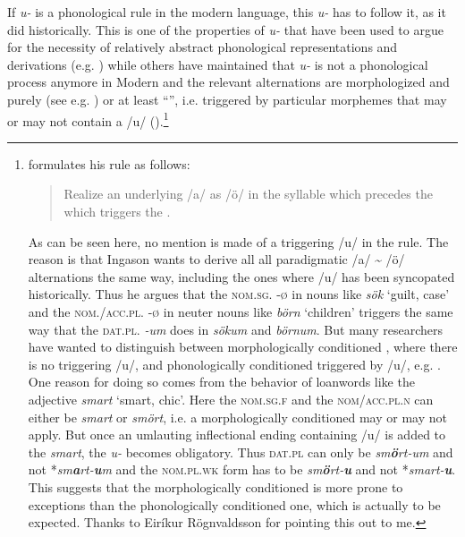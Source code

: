 \documentclass[output=paper,
modfonts
]{LSP/langsci}
\begin{document}
\noindent If \emph{u-} is a phonological rule in the modern language, this
\emph{u-} has to follow it, as it did historically. This is
one of the properties of \emph{u-} that have been used to argue
for the necessity of relatively abstract phonological representations
and derivations (e.g. \citealt{anderson1969a,anderson1974,roegnvaldsson1981,thrainsson2011,hansson2013}) while others have maintained that
\emph{u-} is not a phonological process anymore in Modern
 and the relevant alternations are morphologized and purely
 (see e.g. \citealt{markusson2012}) or at least ``'',
i.e. triggered by particular morphemes that may or may not contain a /u/
(\citealt{ingason2016}).\footnote{\citet[220]{ingason2016} formulates his  rule as follows:

  \begin{quote}
  Realize an underlying /a/ as /ö/ in the syllable which precedes the
   which triggers the .
  \end{quote}

  \noindent As can be seen here, no mention is made of a triggering /u/ in the
  rule. The reason is that Ingason wants to derive all all paradigmatic
  /a/ \textasciitilde{} /ö/ alternations the same way, including the
  ones where /u/ has been syncopated historically. Thus he argues that
  the \textsc{nom.sg.}  -\textsc{ø} in  nouns like
  \emph{sök} `guilt, case' and the \textsc{nom./acc.pl.} 
  -\textsc{ø} in neuter nouns like \emph{börn} `children' triggers
   the same way that the \textsc{dat.pl.}  \emph{-um} does
  in \emph{sökum} and \emph{börnum}. But many researchers have wanted to
  distinguish between morphologically conditioned , where there is
  no triggering /u/, and phonologically conditioned  triggered by
  /u/, e.g. \citet{roegnvaldsson1981}. One reason for doing so comes from the
  behavior of loanwords like the adjective \emph{smart} `smart, chic'.
  Here the \textsc{nom.sg.f} and the \textsc{nom/acc.pl.n} can either be
  \emph{smart} or \emph{smört}, i.e. a morphologically conditioned
   may or may not apply. But once an umlauting inflectional ending
  containing /u/ is added to the  \emph{smart}, the
  \emph{u-} becomes obligatory. Thus \textsc{dat.pl} can only be
  \emph{sm\textbf{ö}rt-um} and not *\emph{sm\textbf{a}rt-\textbf{u}m}
  and the \textsc{nom.pl.wk} form has to be
  \emph{sm\textbf{ö}rt-\textbf{u}} and not *\emph{smart-\textbf{u}}.
  This suggests that the morphologically conditioned  is more
  prone to exceptions than the phonologically conditioned one, which is
  actually to be expected. Thanks to Eiríkur Rögnvaldsson for pointing
  this out to me.}
\end{document}
